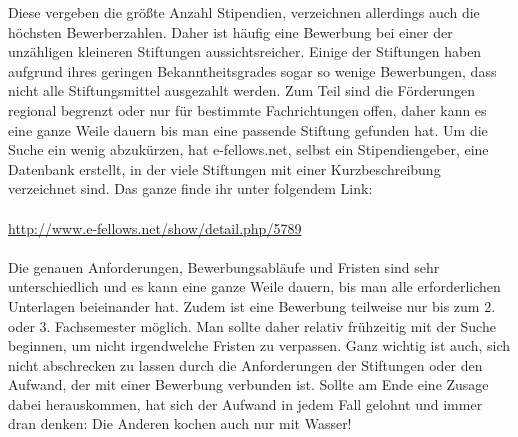Diese vergeben die größte Anzahl Stipendien, verzeichnen allerdings auch die höchsten Bewerberzahlen. Daher ist häufig eine Bewerbung bei einer der unzähligen kleineren Stiftungen aussichtsreicher. Einige der Stiftungen haben aufgrund ihres geringen Bekanntheitsgrades sogar so wenige Bewerbungen, dass nicht alle Stiftungsmittel ausgezahlt werden. Zum Teil sind die Förderungen regional begrenzt oder nur für bestimmte Fachrichtungen offen, daher kann es eine ganze Weile dauern bis man eine passende Stiftung gefunden hat. Um die Suche ein wenig abzukürzen, hat e-fellows.net, selbst ein Stipendiengeber, eine Datenbank erstellt, in der viele Stiftungen mit einer Kurzbeschreibung verzeichnet sind. Das ganze finde ihr unter folgendem Link:\\ 
\\
\url{http://www.e-fellows.net/show/detail.php/5789}\\
\\
Die genauen Anforderungen, Bewerbungsabläufe und Fristen sind sehr unterschiedlich und es kann eine ganze Weile dauern, bis man alle erforderlichen Unterlagen beieinander hat. Zudem ist eine Bewerbung teilweise nur bis zum 2. oder 3. Fachsemester möglich. Man sollte daher relativ frühzeitig mit der Suche beginnen, um nicht irgendwelche Fristen zu verpassen. Ganz wichtig ist auch, sich nicht abschrecken zu lassen durch die Anforderungen der Stiftungen oder den Aufwand, der mit einer Bewerbung verbunden ist. Sollte am Ende eine Zusage dabei herauskommen, hat sich der Aufwand in jedem Fall gelohnt und immer dran denken: Die Anderen kochen auch nur mit Wasser!

